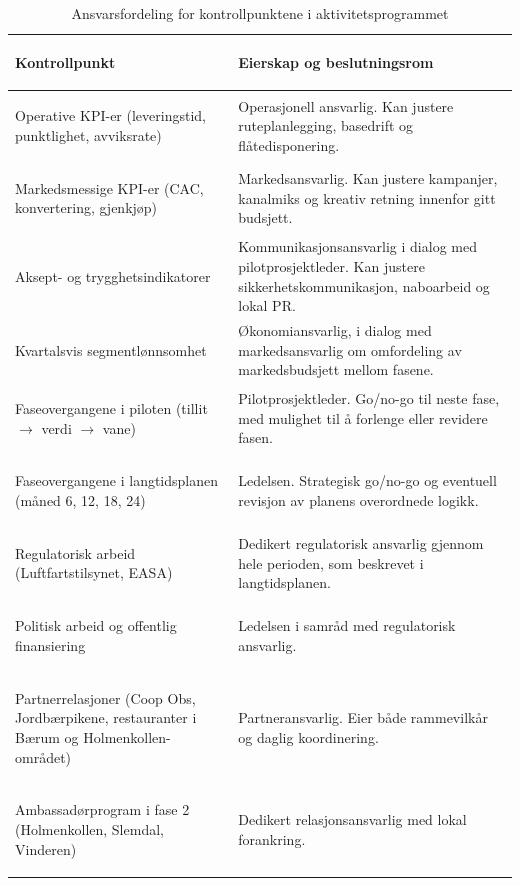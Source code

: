 \begin{table}[H]
\centering
\caption{Ansvarsfordeling for kontrollpunktene i aktivitetsprogrammet}
\label{tab:ansvar-kontroll}
\renewcommand{\arraystretch}{1.3}
\begin{tabularx}{\textwidth}{@{} >{\bfseries\raggedright\arraybackslash}p{5.6cm} >{\raggedright\arraybackslash}X @{}}
\toprule
\rowcolor{tableheader}
\color{white}\textbf{Kontrollpunkt} &
\color{white}\textbf{Eierskap og beslutningsrom} \\
\midrule
Operative KPI-er (leveringstid, punktlighet, avviksrate) &
Operasjonell ansvarlig. Kan justere ruteplanlegging, basedrift og
flåtedisponering. \\
Markedsmessige KPI-er (CAC, konvertering, gjenkjøp) &
Markedsansvarlig. Kan justere kampanjer, kanalmiks og kreativ retning
innenfor gitt budsjett. \\
Aksept- og trygghetsindikatorer &
Kommunikasjonsansvarlig i dialog med pilotprosjektleder. Kan justere
sikkerhetskommunikasjon, naboarbeid og lokal PR. \\
Kvartalsvis segmentlønnsomhet &
Økonomiansvarlig, i dialog med markedsansvarlig om omfordeling av
markedsbudsjett mellom fasene. \\
Faseovergangene i piloten (tillit $\to$ verdi $\to$ vane) &
Pilotprosjektleder. Go/no-go til neste fase, med mulighet til å forlenge
eller revidere fasen. \\
Faseovergangene i langtidsplanen (måned 6, 12, 18, 24) &
Ledelsen. Strategisk go/no-go og eventuell revisjon av planens
overordnede logikk. \\
Regulatorisk arbeid (Luftfartstilsynet, EASA) &
Dedikert regulatorisk ansvarlig gjennom hele perioden, som beskrevet i
langtidsplanen. \\
Politisk arbeid og offentlig finansiering &
Ledelsen i samråd med regulatorisk ansvarlig. \\
Partnerrelasjoner (Coop Obs, Jordbærpikene, restauranter i Bærum og
Holmenkollen-området) &
Partneransvarlig. Eier både rammevilkår og daglig koordinering. \\
Ambassadørprogram i fase 2 (Holmenkollen, Slemdal, Vinderen) &
Dedikert relasjonsansvarlig med lokal forankring. \\
\bottomrule
\end{tabularx}
\end{table}
